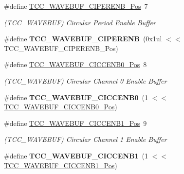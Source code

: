 \begin{DoxyCompactItemize}
\item 
\hypertarget{group___s_a_m_l21___t_c_c_ga1f5201a82d1fc4f178435393ea83ff8b}{}\#define \hyperlink{group___s_a_m_l21___t_c_c_ga1f5201a82d1fc4f178435393ea83ff8b}{T\+C\+C\+\_\+\+W\+A\+V\+E\+B\+U\+F\+\_\+\+C\+I\+P\+E\+R\+E\+N\+B\+\_\+\+Pos}~7\label{group___s_a_m_l21___t_c_c_ga1f5201a82d1fc4f178435393ea83ff8b}

\begin{DoxyCompactList}\small\item\em (T\+C\+C\+\_\+\+W\+A\+V\+E\+B\+U\+F) Circular Period Enable Buffer \end{DoxyCompactList}\item 
\hypertarget{group___s_a_m_l21___t_c_c_ga796f0934d1e94c6fcd2218b9bbaa85e9}{}\#define {\bfseries T\+C\+C\+\_\+\+W\+A\+V\+E\+B\+U\+F\+\_\+\+C\+I\+P\+E\+R\+E\+N\+B}~(0x1ul $<$$<$ T\+C\+C\+\_\+\+W\+A\+V\+E\+B\+U\+F\+\_\+\+C\+I\+P\+E\+R\+E\+N\+B\+\_\+\+Pos)\label{group___s_a_m_l21___t_c_c_ga796f0934d1e94c6fcd2218b9bbaa85e9}

\item 
\hypertarget{group___s_a_m_l21___t_c_c_ga30e093b7c7baea8c4a4af48117498886}{}\#define \hyperlink{group___s_a_m_l21___t_c_c_ga30e093b7c7baea8c4a4af48117498886}{T\+C\+C\+\_\+\+W\+A\+V\+E\+B\+U\+F\+\_\+\+C\+I\+C\+C\+E\+N\+B0\+\_\+\+Pos}~8\label{group___s_a_m_l21___t_c_c_ga30e093b7c7baea8c4a4af48117498886}

\begin{DoxyCompactList}\small\item\em (T\+C\+C\+\_\+\+W\+A\+V\+E\+B\+U\+F) Circular Channel 0 Enable Buffer \end{DoxyCompactList}\item 
\hypertarget{group___s_a_m_l21___t_c_c_ga4cac65312513ff7140d17a4e2c1a23ed}{}\#define {\bfseries T\+C\+C\+\_\+\+W\+A\+V\+E\+B\+U\+F\+\_\+\+C\+I\+C\+C\+E\+N\+B0}~(1 $<$$<$ \hyperlink{group___s_a_m_l21___t_c_c_ga30e093b7c7baea8c4a4af48117498886}{T\+C\+C\+\_\+\+W\+A\+V\+E\+B\+U\+F\+\_\+\+C\+I\+C\+C\+E\+N\+B0\+\_\+\+Pos})\label{group___s_a_m_l21___t_c_c_ga4cac65312513ff7140d17a4e2c1a23ed}

\item 
\hypertarget{group___s_a_m_l21___t_c_c_ga92ef25e7793019f7318a3a08fdd7c169}{}\#define \hyperlink{group___s_a_m_l21___t_c_c_ga92ef25e7793019f7318a3a08fdd7c169}{T\+C\+C\+\_\+\+W\+A\+V\+E\+B\+U\+F\+\_\+\+C\+I\+C\+C\+E\+N\+B1\+\_\+\+Pos}~9\label{group___s_a_m_l21___t_c_c_ga92ef25e7793019f7318a3a08fdd7c169}

\begin{DoxyCompactList}\small\item\em (T\+C\+C\+\_\+\+W\+A\+V\+E\+B\+U\+F) Circular Channel 1 Enable Buffer \end{DoxyCompactList}\item 
\hypertarget{group___s_a_m_l21___t_c_c_ga3eded121d001a878ab9f7bc54cde68a0}{}\#define {\bfseries T\+C\+C\+\_\+\+W\+A\+V\+E\+B\+U\+F\+\_\+\+C\+I\+C\+C\+E\+N\+B1}~(1 $<$$<$ \hyperlink{group___s_a_m_l21___t_c_c_ga92ef25e7793019f7318a3a08fdd7c169}{T\+C\+C\+\_\+\+W\+A\+V\+E\+B\+U\+F\+\_\+\+C\+I\+C\+C\+E\+N\+B1\+\_\+\+Pos})\label{group___s_a_m_l21___t_c_c_ga3eded121d001a878ab9f7bc54cde68a0}


\end{DoxyCompactItemize}
